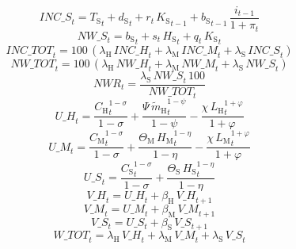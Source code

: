 \begin{dmath}
{INC\_S}_{t}={T_\mathrm{S}}_{t}+{d_\mathrm{S}}_{t}+{r}_{t}\, {K_\mathrm{S}}_{t-1}+{b_\mathrm{S}}_{t-1}\, \frac{{i}_{t-1}}{1+{\pi}_{t}}
\end{dmath}
\begin{dmath}
{NW\_S}_{t}={b_\mathrm{S}}_{t}+{s}_{t}\, {H_\mathrm{S}}_{t}+{q}_{t}\, {K_\mathrm{S}}_{t}
\end{dmath}
\begin{dmath}
{INC\_TOT}_{t}=100\, \left({\lambda_\mathrm{H}}\, {INC\_H}_{t}+{\lambda_\mathrm{M}}\, {INC\_M}_{t}+{\lambda_\mathrm{S}}\, {INC\_S}_{t}\right)
\end{dmath}
\begin{dmath}
{NW\_TOT}_{t}=100\, \left({\lambda_\mathrm{H}}\, {NW\_H}_{t}+{\lambda_\mathrm{M}}\, {NW\_M}_{t}+{\lambda_\mathrm{S}}\, {NW\_S}_{t}\right)
\end{dmath}
\begin{dmath}
{NWR}_{t}=\frac{{\lambda_\mathrm{S}}\, {NW\_S}_{t}\, 100}{{NW\_TOT}_{t}}
\end{dmath}
\begin{dmath}
{U\_H}_{t}=\frac{{C_\mathrm{H}}_{t}^{1-{\sigma}}}{1-{\sigma}}+\frac{{\Psi}\, {\widetilde{m}_\mathrm{H}}_{t}^{1-{\psi}}}{1-{\psi}}-\frac{{\chi}\, {L_\mathrm{H}}_{t}^{1+{\varphi}}}{1+{\varphi}}
\end{dmath}
\begin{dmath}
{U\_M}_{t}=\frac{{C_\mathrm{M}}_{t}^{1-{\sigma}}}{1-{\sigma}}+\frac{{\Theta_\mathrm{M}}\, {H_\mathrm{M}}_{t}^{1-{\eta}}}{1-{\eta}}-\frac{{\chi}\, {L_\mathrm{M}}_{t}^{1+{\varphi}}}{1+{\varphi}}
\end{dmath}
\begin{dmath}
{U\_S}_{t}=\frac{{C_\mathrm{S}}_{t}^{1-{\sigma}}}{1-{\sigma}}+\frac{{\Theta_\mathrm{S}}\, {H_\mathrm{S}}_{t}^{1-{\eta}}}{1-{\eta}}
\end{dmath}
\begin{dmath}
{V\_H}_{t}={U\_H}_{t}+{\beta_\mathrm{H}}\, {V\_H}_{t+1}
\end{dmath}
\begin{dmath}
{V\_M}_{t}={U\_M}_{t}+{\beta_\mathrm{M}}\, {V\_M}_{t+1}
\end{dmath}
\begin{dmath}
{V\_S}_{t}={U\_S}_{t}+{\beta_\mathrm{S}}\, {V\_S}_{t+1}
\end{dmath}
\begin{dmath}
{W\_TOT}_{t}={\lambda_\mathrm{H}}\, {V\_H}_{t}+{\lambda_\mathrm{M}}\, {V\_M}_{t}+{\lambda_\mathrm{S}}\, {V\_S}_{t}
\end{dmath}
